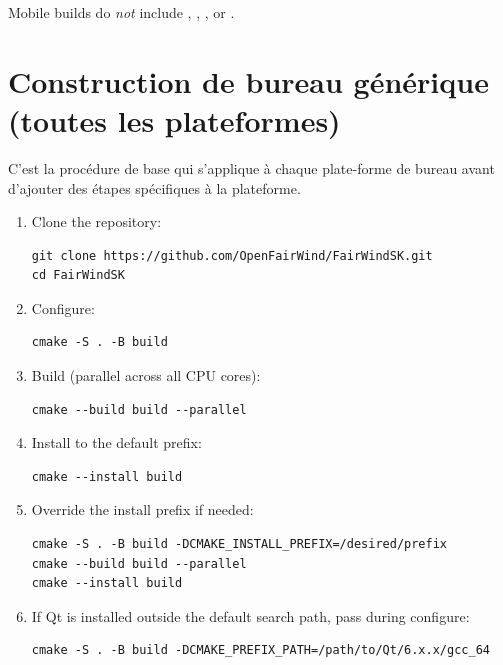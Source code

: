 Mobile builds do \emph{not} include , ,
, or .

\section{Construction de bureau générique (toutes les plateformes)}
\label{app:generic}

C'est la procédure de base qui s'applique à chaque plate-forme de bureau
avant d'ajouter des étapes spécifiques à la plateforme.

\begin{enumerate}
  \item Clone the repository:
\begin{lstlisting}
git clone https://github.com/OpenFairWind/FairWindSK.git
cd FairWindSK
\end{lstlisting}

  \item Configure:
\begin{lstlisting}
cmake -S . -B build
\end{lstlisting}

  \item Build (parallel across all CPU cores):
\begin{lstlisting}
cmake --build build --parallel
\end{lstlisting}

  \item Install to the default prefix:
\begin{lstlisting}
cmake --install build
\end{lstlisting}

  \item Override the install prefix if needed:
\begin{lstlisting}
cmake -S . -B build -DCMAKE_INSTALL_PREFIX=/desired/prefix
cmake --build build --parallel
cmake --install build
\end{lstlisting}

  \item If Qt is installed outside the default search path, pass
         during configure:
\begin{lstlisting}
cmake -S . -B build -DCMAKE_PREFIX_PATH=/path/to/Qt/6.x.x/gcc_64
\end{lstlisting}
\end{enumerate}

